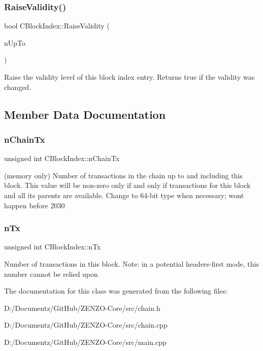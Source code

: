 \subsubsection{\texorpdfstring{RaiseValidity()}{RaiseValidity()}}
{\footnotesize\ttfamily bool C\+Block\+Index\+::\+Raise\+Validity (\begin{DoxyParamCaption}\item[{enum Block\+Status}]{n\+Up\+To }\end{DoxyParamCaption})\hspace{0.3cm}{\ttfamily [inline]}}

Raise the validity level of this block index entry. Returns true if the validity was changed. 

\subsection{Member Data Documentation}
\mbox{\label{class_c_block_index_af3c6d6dd8a7579e5ce516d94b98d2db5}} 
\subsubsection{\texorpdfstring{nChainTx}{nChainTx}}
{\footnotesize\ttfamily unsigned int C\+Block\+Index\+::n\+Chain\+Tx}

(memory only) Number of transactions in the chain up to and including this block. This value will be non-\/zero only if and only if transactions for this block and all its parents are available. Change to 64-\/bit type when necessary; won\textquotesingle{}t happen before 2030 \mbox{\label{class_c_block_index_ac8e219a377839d2f9133a4387f46e44e}} 
\subsubsection{\texorpdfstring{nTx}{nTx}}
{\footnotesize\ttfamily unsigned int C\+Block\+Index\+::n\+Tx}

Number of transactions in this block. Note\+: in a potential headers-\/first mode, this number cannot be relied upon 

The documentation for this class was generated from the following files\+:\begin{DoxyCompactItemize}
\item 
D\+:/\+Documentz/\+Git\+Hub/\+Z\+E\+N\+Z\+O-\/\+Core/src/chain.\+h\item 
D\+:/\+Documentz/\+Git\+Hub/\+Z\+E\+N\+Z\+O-\/\+Core/src/chain.\+cpp\item 
D\+:/\+Documentz/\+Git\+Hub/\+Z\+E\+N\+Z\+O-\/\+Core/src/main.\+cpp\end{DoxyCompactItemize}
